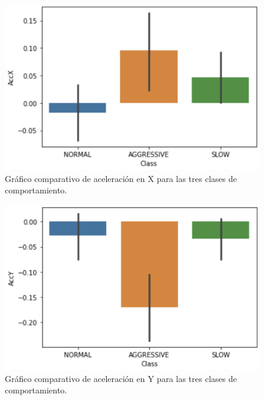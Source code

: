 \documentclass[spanish,12pt,letterpaper]{article}
\begin{document}
    \begin{figure}[htb]
        \centering
        \includegraphics[width=1\columnwidth]{AccX.png}
        \caption{Gráfico comparativo de aceleración en X para las tres clases de comportamiento.}
        \label{fig:comand}%
    \end{figure}

    \begin{figure}[htb]
        \centering
        \includegraphics[width=1\columnwidth]{AccY.png}
        \caption{Gráfico comparativo de aceleración en Y para las tres clases de comportamiento.}
        \label{fig:comand}%
    \end{figure}
\end{document}
